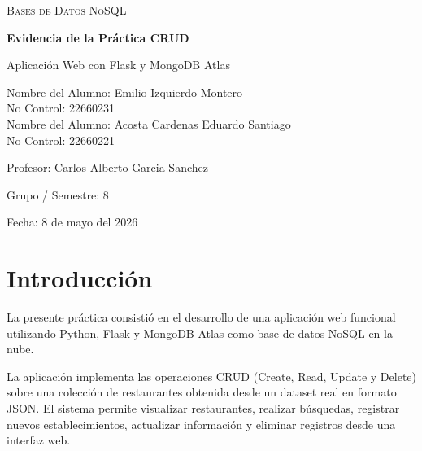 \documentclass[12pt]{article}
\begin{document}

\begin{titlepage}
    \centering


    {\scshape\Large Bases de Datos NoSQL \par}
    \vspace{1.5cm}

    {\huge\bfseries Evidencia de la Práctica CRUD \par}
    \vspace{0.5cm}

    {\Large Aplicación Web con Flask y MongoDB Atlas \par}

    \vfill

    {\large
    Nombre del Alumno: Emilio Izquierdo Montero \\
    No Control: 22660231 \\
    Nombre del Alumno: Acosta Cardenas Eduardo Santiago \\
    No Control: 22660221 \\
    \vspace{0.3cm}

    Profesor: Carlos Alberto Garcia Sanchez \\
    \vspace{0.3cm}

    Grupo / Semestre: 8 \\
    \vspace{0.3cm}

    Fecha: 8 de mayo del 2026
    \par}

    \vfill

\end{titlepage}

\section{Introducción}

La presente práctica consistió en el desarrollo de una aplicación web funcional utilizando Python, Flask y MongoDB Atlas como base de datos NoSQL en la nube.

La aplicación implementa las operaciones CRUD (Create, Read, Update y Delete) sobre una colección de restaurantes obtenida desde un dataset real en formato JSON. El sistema permite visualizar restaurantes, realizar búsquedas, registrar nuevos establecimientos, actualizar información y eliminar registros desde una interfaz web.
\end{document}
